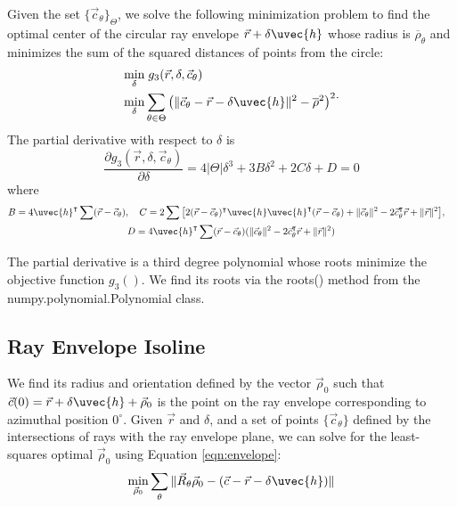 Given the set $\{\vec{c}_\theta\}_\Theta$, we solve the following minimization problem to find the optimal center of the circular ray envelope $\vec{r} + \delta \uvec{h}$ whose radius is $\overline{\rho}_\theta$ and minimizes the sum of the squared distances of points from the circle:
\begin{equation}
    \begin{split}
        \min_\delta & \; g_3(\vec{r}, \delta, \vec{c}_\theta) \\
        \min_\delta & \sum_{\theta \in \Theta} \big( \| \vec{c}_\theta - \vec{r} - \delta \uvec{h} \|^2 - \overline{\rho}^2 \big)^2
    \end{split}.
\end{equation}
%
The partial derivative with respect to $\delta$ is
\begin{equation}
    \frac{\partial g_3(\vec{r}, \delta, \vec{c}_\theta)}{\partial \delta} = 4 |\Theta| \delta^3 + 3 B \delta^2 + 2 C \delta + D = 0
\end{equation}
where
\begin{gather}
    B = 4\uvec{h}^\intercal \sum (\vec{r} - \vec{c}_\theta), \quad C = 2\sum \big[2(\vec{r} - \vec{c}_\theta)^\intercal \uvec{h}\uvec{h}^\intercal(\vec{r} - \vec{c}_\theta) + \|\vec{c}_\theta\|^2 - 2\vec{c}^\intercal_\theta \vec{r} + \|\vec{r}\|^2 \big], \quad \\ D = 4\uvec{h}^\intercal \sum (\vec{r} - \vec{c}_\theta)(\|\vec{c}_\theta\|^2 - 2\vec{c}^\intercal_\theta \vec{r} + \|\vec{r}\|^2)
\end{gather}

The partial derivative is a third degree polynomial whose roots minimize the objective function $g_3()$. We find its roots via the roots() method from the numpy.polynomial.Polynomial class.

\subsection{Ray Envelope Isoline}
We find its radius and orientation defined by the vector $\vec{\rho}_0$ such that $\vec{c}(0) = \vec{r} + \delta \uvec{h} + \vec{\rho}_0$ is the point on the ray envelope corresponding to azimuthal position $0^\circ$. Given $\vec{r}$ and $\delta$, and a set of points $\{\vec{c}_\theta\}$ defined by the intersections of rays with the ray envelope plane, we can solve for the least-squares optimal $\vec{\rho}_0$ using Equation \ref{eqn:envelope}:
%
\begin{equation}
    \min_{\vec{\rho}_0} \sum_{\theta} \| \vec{R}_\theta \vec{\rho}_0 - (\vec{c} - \vec{r} - \delta \uvec{h}) \|
\end{equation}


